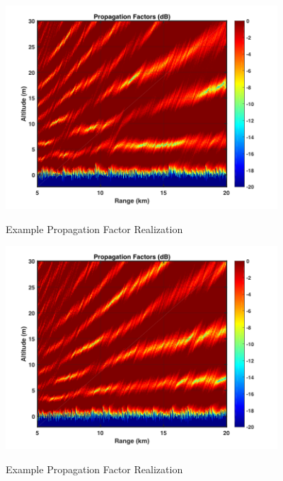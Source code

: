 \begin{figure}[H]
  \begin{center}
\includegraphics[width=4in]{../media/statistics/pf_1.png}
  \end{center}
  \renewcommand{\baselinestretch}{1} \small\normalsize
  \begin{quote}
    \caption[Example Propagation Factor Realization]{Example Propagation Factor Realization\label{stat_fig:1a}}
  \end{quote}
\end{figure}
\renewcommand{\baselinestretch}{2} \small\normalsize

\begin{figure}[H]
  \begin{center}
\includegraphics[width=4in]{../media/statistics/pf_2.png}
  \end{center}
  \renewcommand{\baselinestretch}{1} \small\normalsize
  \begin{quote}
    \caption[Example Propagation Factor Realization]{Example Propagation Factor Realization\label{stat_fig:1b}}
  \end{quote}
\end{figure}
\renewcommand{\baselinestretch}{2} \small\normalsize

